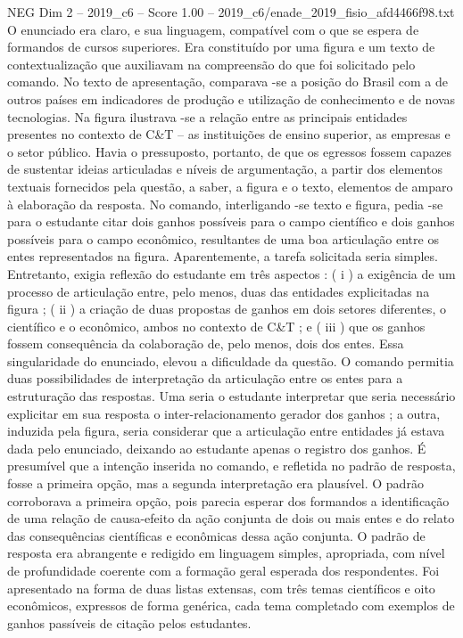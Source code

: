 \begin{textsample}{NEG Dim 2 – 2019\_c6 – Score 1.00 – 2019\_c6/enade\_2019\_fisio\_afd4466f98.txt}
O enunciado era claro, e sua linguagem, compatível com o que se espera de formandos de cursos superiores.
Era constituído por uma figura e um texto de contextualização que auxiliavam na compreensão do que foi solicitado pelo comando.
No texto de apresentação, comparava -se a posição do Brasil com a de outros países em indicadores de produção e utilização de conhecimento e de novas tecnologias.
Na figura ilustrava -se a relação entre as principais entidades presentes no contexto de C\&T – as instituições de ensino superior, as empresas e o setor público.
Havia o pressuposto, portanto, de que os egressos fossem capazes de sustentar ideias articuladas e níveis de argumentação, a partir dos elementos textuais fornecidos pela questão, a saber, a figura e o texto, elementos de amparo à elaboração da resposta.
No comando, interligando -se texto e figura, pedia -se para o estudante citar dois ganhos possíveis para o campo científico e dois ganhos possíveis para o campo econômico, resultantes de uma boa articulação entre os entes representados na figura.
Aparentemente, a tarefa solicitada seria simples.
Entretanto, exigia reflexão do estudante em três aspectos : ( i ) a exigência de um processo de articulação entre, pelo menos, duas das entidades explicitadas na figura ; ( ii ) a criação de duas propostas de ganhos em dois setores diferentes, o científico e o econômico, ambos no contexto de C\&T ; e ( iii ) que os ganhos fossem consequência da colaboração de, pelo menos, dois dos entes.
Essa singularidade do enunciado, elevou a dificuldade da questão.
O comando permitia duas possibilidades de interpretação da articulação entre os entes para a estruturação das respostas.
Uma seria o estudante interpretar que seria necessário explicitar em sua resposta o inter-relacionamento gerador dos ganhos ; a outra, induzida pela figura, seria considerar que a articulação entre entidades já estava dada pelo enunciado, deixando ao estudante apenas o registro dos ganhos.
É presumível que a intenção inserida no comando, e refletida no padrão de resposta, fosse a primeira opção, mas a segunda interpretação era plausível.
O padrão corroborava a primeira opção, pois parecia esperar dos formandos a identificação de uma relação de causa-efeito da ação conjunta de dois ou mais entes e do relato das consequências científicas e econômicas dessa ação conjunta.
O padrão de resposta era abrangente e redigido em linguagem simples, apropriada, com nível de profundidade coerente com a formação geral esperada dos respondentes.
Foi apresentado na forma de duas listas extensas, com três temas científicos e oito econômicos, expressos de forma genérica, cada tema completado com exemplos de ganhos passíveis de citação pelos estudantes.

\end{textsample}
